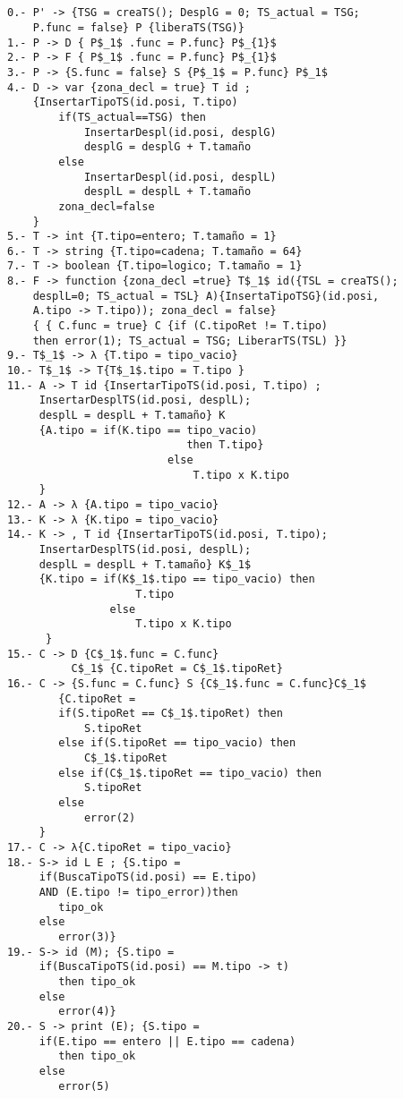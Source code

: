 \documentclass[a4paper, 12pt]{article}
\begin{document}
\begin{lstlisting}[style=EstadosAutomataST]


0.- P' -> {TSG = creaTS(); DesplG = 0; TS_actual = TSG;
    P.func = false} P {liberaTS(TSG)}
1.- P -> D { P$_1$ .func = P.func} P$_{1}$
2.- P -> F { P$_1$ .func = P.func} P$_{1}$
3.- P -> {S.func = false} S {P$_1$ = P.func} P$_1$
4.- D -> var {zona_decl = true} T id ;
    {InsertarTipoTS(id.posi, T.tipo)
        if(TS_actual==TSG) then
            InsertarDespl(id.posi, desplG)
            desplG = desplG + T.tamaño
        else
            InsertarDespl(id.posi, desplL)
            desplL = desplL + T.tamaño
        zona_decl=false
    }
5.- T -> int {T.tipo=entero; T.tamaño = 1}
6.- T -> string {T.tipo=cadena; T.tamaño = 64}
7.- T -> boolean {T.tipo=logico; T.tamaño = 1}
8.- F -> function {zona_decl =true} T$_1$ id({TSL = creaTS();
    desplL=0; TS_actual = TSL} A){InsertaTipoTSG}(id.posi,
    A.tipo -> T.tipo)); zona_decl = false}
    { { C.func = true} C {if (C.tipoRet != T.tipo)
    then error(1); TS_actual = TSG; LiberarTS(TSL) }}
9.- T$_1$ -> λ {T.tipo = tipo_vacio}
10.- T$_1$ -> T{T$_1$.tipo = T.tipo }
11.- A -> T id {InsertarTipoTS(id.posi, T.tipo) ;
     InsertarDesplTS(id.posi, desplL);
     desplL = desplL + T.tamaño} K
     {A.tipo = if(K.tipo == tipo_vacio)
                            then T.tipo}
                         else
                             T.tipo x K.tipo
     }
12.- A -> λ {A.tipo = tipo_vacio}
13.- K -> λ {K.tipo = tipo_vacio}
14.- K -> , T id {InsertarTipoTS(id.posi, T.tipo);
     InsertarDesplTS(id.posi, desplL);
     desplL = desplL + T.tamaño} K$_1$
     {K.tipo = if(K$_1$.tipo == tipo_vacio) then
                    T.tipo
                else
                    T.tipo x K.tipo
      }
15.- C -> D {C$_1$.func = C.func}
          C$_1$ {C.tipoRet = C$_1$.tipoRet}
16.- C -> {S.func = C.func} S {C$_1$.func = C.func}C$_1$
        {C.tipoRet =
        if(S.tipoRet == C$_1$.tipoRet) then
            S.tipoRet
        else if(S.tipoRet == tipo_vacio) then
            C$_1$.tipoRet
        else if(C$_1$.tipoRet == tipo_vacio) then
            S.tipoRet
        else
            error(2)
     }
17.- C -> λ{C.tipoRet = tipo_vacio}
18.- S-> id L E ; {S.tipo =
     if(BuscaTipoTS(id.posi) == E.tipo)
     AND (E.tipo != tipo_error))then
        tipo_ok
     else
        error(3)}
19.- S-> id (M); {S.tipo =
     if(BuscaTipoTS(id.posi) == M.tipo -> t)
        then tipo_ok
     else
        error(4)}
20.- S -> print (E); {S.tipo =
     if(E.tipo == entero || E.tipo == cadena)
        then tipo_ok
     else
        error(5)

\end{lstlisting}
\end{document}
